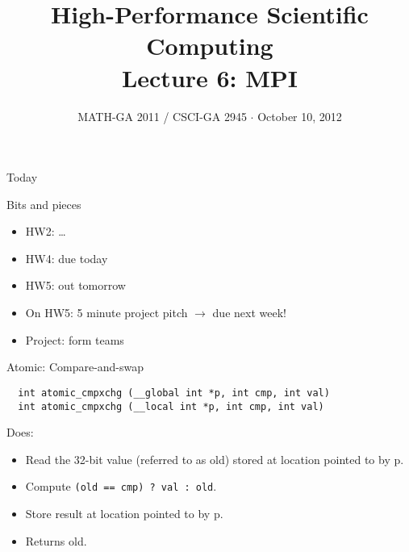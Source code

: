 \documentclass[english,compress]{beamer}
\begin{document}

\title{High-Performance Scientific Computing\\Lecture 6: MPI}

\date{MATH-GA 2011 / CSCI-GA 2945 $\cdot$ October 10, 2012}

\frame{\titlepage}

\begin{frame}{Today}
  \tableofcontents[hideallsubsections]
\end{frame}
\begin{frame}{Bits and pieces}
  \begin{itemize}
    \item HW2: \dots
    \item HW4: due today
    \item HW5: out tomorrow
    \item On HW5: 5 minute project pitch $\rightarrow$ due next week!
    \item Project: form teams
  \end{itemize}
\end{frame}
\begin{frame}[fragile]{Atomic: Compare-and-swap}
  \begin{lstlisting}
  int atomic_cmpxchg (__global int *p, int cmp, int val)
  int atomic_cmpxchg (__local int *p, int cmp, int val)
  \end{lstlisting}

  Does:
  \begin{itemize}
    \item Read the 32-bit value (referred to as
    old) stored at location pointed to by p.
  \item Compute \texttt{(old == cmp) ? val : old}.
  \item Store result at location pointed to by p.
  \item Returns old.
  \end{itemize}
\end{frame}
\end{document}
